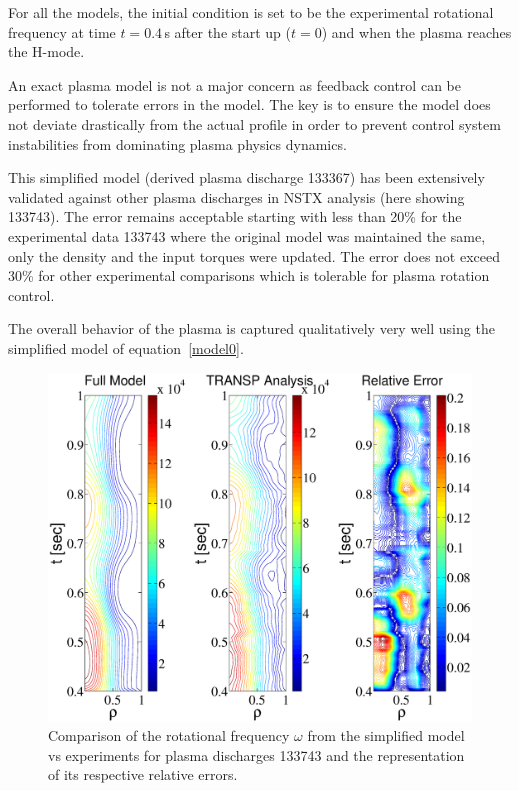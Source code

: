 \documentclass[12pt]{iopart}
\begin{document}
For all the models, the initial condition is set to be the experimental rotational frequency at  time $t=0.4$\,s after the start up ($t=0$) and when the plasma reaches the H-mode.

An exact plasma model is not a major concern as feedback control can be performed to tolerate errors in the model. The key is to ensure the model does not deviate drastically from the actual profile in order to prevent control system instabilities from dominating plasma physics dynamics.

This simplified model (derived plasma discharge 133367) has been extensively validated against other plasma discharges in NSTX analysis (here showing 133743). The error remains acceptable starting with less than 20\% for the  experimental data 133743 where the original model was maintained the same, only the density and the input torques were updated. The error does not exceed 30\% for other experimental comparisons which is tolerable for plasma rotation control.

The overall behavior of the plasma is captured qualitatively very well using the simplified model of equation~\ref{model0}. 

\begin{figure}
\includegraphics[width=\linewidth]{imene_figs/bessel_comp} %
\caption{Comparison of the rotational frequency $\omega$ from the simplified model vs experiments for plasma discharges 133743  and the representation of its respective relative errors.}
\label{fig10}
\end{figure}
\end{document}
